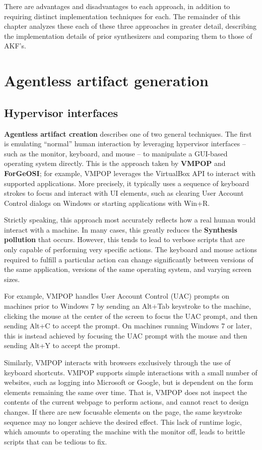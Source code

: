 \documentclass[letterpaper,12pt]{report}
\begin{document}
There are advantages and disadvantages to each approach, in addition to
requiring distinct implementation techniques for each. The remainder of
this chapter analyzes these each of these three approaches in greater
detail, describing the implementation details of prior synthesizers and
comparing them to those of AKF's.

\section{Agentless artifact
generation}\label{agentless-artifact-generation}

\subsection{Hypervisor interfaces}\label{hypervisor-interfaces}

\textbf{Agentless artifact creation} describes one of two general
techniques. The first is emulating ``normal'' human interaction by
leveraging hypervisor interfaces -- such as the monitor, keyboard, and
mouse -- to manipulate a GUI-based operating system directly. This is
the approach taken by \textbf{VMPOP} and \textbf{ForGeOSI}; for example,
VMPOP leverages the VirtualBox API to interact with supported
applications. More precisely, it typically uses a sequence of keyboard
strokes to focus and interact with UI elements, such as clearing User
Account Control dialogs on Windows or starting applications with Win+R.

Strictly speaking, this approach most accurately reflects how a real
human would interact with a machine. In many cases, this greatly reduces
the \textbf{Synthesis pollution} that occurs. However, this tends to
lead to verbose scripts that are only capable of performing very
specific actions. The keyboard and mouse actions required to fulfill a
particular action can change significantly between versions of the same
application, versions of the same operating system, and varying screen
sizes.

For example, VMPOP handles User Account Control (UAC) prompts on
machines prior to Windows 7 by sending an Alt+Tab keystroke to the
machine, clicking the mouse at the center of the screen to focus the UAC
prompt, and then sending Alt+C to accept the prompt. On machines running
Windows 7 or later, this is instead achieved by focusing the UAC prompt
with the mouse and then sending Alt+Y to accept the prompt.

Similarly, VMPOP interacts with browsers exclusively through the use of
keyboard shortcuts. VMPOP supports simple interactions with a small
number of websites, such as logging into Microsoft or Google, but is
dependent on the form elements remaining the same over time. That is,
VMPOP does not inspect the contents of the current webpage to perform
actions, and cannot react to design changes. If there are new focusable
elements on the page, the same keystroke sequence may no longer achieve
the desired effect. This lack of runtime logic, which amounts to
operating the machine with the monitor off, leads to brittle scripts
that can be tedious to fix.
\end{document}
